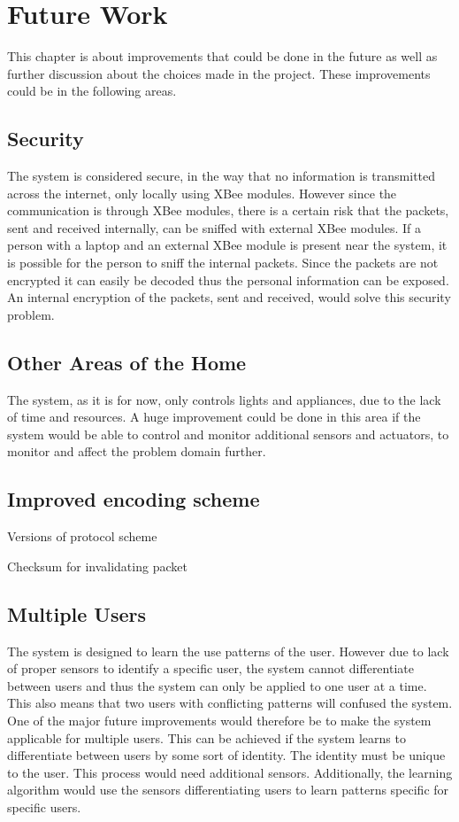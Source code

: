 \chapter{Future Work}
\label{chap:future_work}
This chapter is about improvements that could be done in the future as well as further discussion about the choices made in the project. These improvements could be in the following areas.

\section{Security}
The system is considered secure, in the way that no information is transmitted across the internet, only locally using XBee modules. However since the communication is through XBee modules, there is a certain risk that the packets, sent and received internally, can be sniffed with external XBee modules. If a person with a laptop and an external XBee module is present near the system, it is possible for the person to sniff the internal packets. Since the packets are not encrypted it can easily be decoded thus the personal information can be exposed. An internal encryption of the packets, sent and received, would solve this security problem.

\section{Other Areas of the Home}
The system, as it is for now, only controls lights and appliances, due to the lack of time and resources. A huge improvement could be done in this area if the system would be able to control and monitor additional sensors and actuators, to monitor and affect the problem domain further.

\section{Improved encoding scheme}
Versions of protocol scheme

Checksum for invalidating packet

\section{Multiple Users}
The system is designed to learn the use patterns of the user. However due to lack of proper sensors to identify a specific user, the system cannot differentiate between users and thus the system can only be applied to one user at a time. This also means that two users with conflicting patterns will confused the system. One of the major future improvements would therefore be to make the system applicable for multiple users. This can be achieved if the system learns to differentiate between users by some sort of identity. The identity must be unique to the user. This process would need additional sensors. Additionally, the learning algorithm would use the sensors differentiating users to learn patterns specific for specific users.

